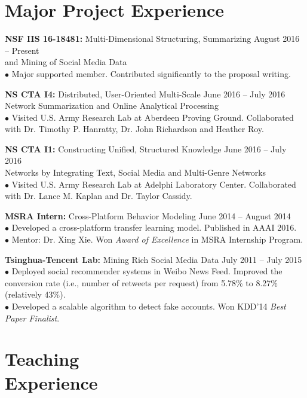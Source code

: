 \documentclass[margin, 10pt]{res}
\begin{document}
\begin{resume}
\section{Major Project Experience}

{\textbf{NSF IIS 16-18481:} Multi-Dimensional Structuring, Summarizing} \hfill{August 2016 -- Present} \\
{and Mining of Social Media Data} \\
$\bullet$ Major supported member. Contributed significantly to the proposal writing.

{\textbf{NS CTA I4:} Distributed, User-Oriented Multi-Scale} \hfill{June 2016 -- July 2016} \\
{Network Summarization and Online Analytical Processing} \\
$\bullet$ Visited U.S. Army Research Lab at Aberdeen Proving Ground.
Collaborated with Dr. Timothy P. Hanratty, Dr. John Richardson and Heather Roy.

{\textbf{NS CTA I1:} Constructing Unified, Structured Knowledge} \hfill{June 2016 -- July 2016} \\
{Networks by Integrating Text, Social Media and Multi-Genre Networks} \hfill{} \\
$\bullet$ Visited U.S. Army Research Lab at Adelphi Laboratory Center. Collaborated with Dr. Lance M. Kaplan and Dr. Taylor Cassidy.

{\textbf{MSRA Intern:} Cross-Platform Behavior Modeling} \hfill{June 2014 -- August 2014} \\
$\bullet$ Developed a cross-platform transfer learning model. Published in AAAI 2016. \\
$\bullet$ Mentor: Dr. Xing Xie. Won \textit{Award of Excellence} in MSRA Internship Program.

{\textbf{Tsinghua-Tencent Lab:} Mining Rich Social Media Data} \hfill{July 2011 -- July 2015} \\
$\bullet$ Deployed social recommender systems in Weibo News Feed. Improved the conversion rate (i.e., number of retweets per request) from 5.78\% to 8.27\% (relatively 43\%). \\
$\bullet$ Developed a scalable algorithm to detect fake accounts. Won KDD'14 \textit{Best Paper Finalist}.


\section{Teaching \\ Experience}


\end{resume}
\end{document}
